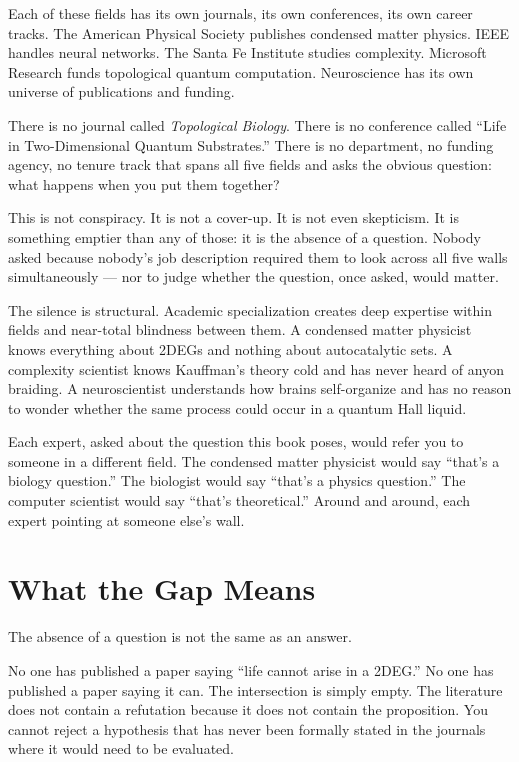 Each of these fields has its own journals, its own conferences, its own career tracks. The American Physical Society publishes condensed matter physics. IEEE handles neural networks. The Santa Fe Institute studies complexity. Microsoft Research funds topological quantum computation. Neuroscience has its own universe of publications and funding.

There is no journal called \textit{Topological Biology}. There is no conference called ``Life in Two-Dimensional Quantum Substrates.'' There is no department, no funding agency, no tenure track that spans all five fields and asks the obvious question: what happens when you put them together?

This is not conspiracy. It is not a cover-up. It is not even skepticism. It is something emptier than any of those: it is the absence of a question. Nobody asked because nobody's job description required them to look across all five walls simultaneously --- nor to judge whether the question, once asked, would matter.

The silence is structural. Academic specialization creates deep expertise within fields and near-total blindness between them. A condensed matter physicist knows everything about 2DEGs and nothing about autocatalytic sets. A complexity scientist knows Kauffman's theory cold and has never heard of anyon braiding. A neuroscientist understands how brains self-organize and has no reason to wonder whether the same process could occur in a quantum Hall liquid.

Each expert, asked about the question this book poses, would refer you to someone in a different field. The condensed matter physicist would say ``that's a biology question.'' The biologist would say ``that's a physics question.'' The computer scientist would say ``that's theoretical.'' Around and around, each expert pointing at someone else's wall.

\section*{What the Gap Means}
\label{spine:sg-what-the-gap-means}

The absence of a question is not the same as an answer.

No one has published a paper saying ``life cannot arise in a 2DEG.'' No one has published a paper saying it can. The intersection is simply empty. The literature does not contain a refutation because it does not contain the proposition. You cannot reject a hypothesis that has never been formally stated in the journals where it would need to be evaluated.

